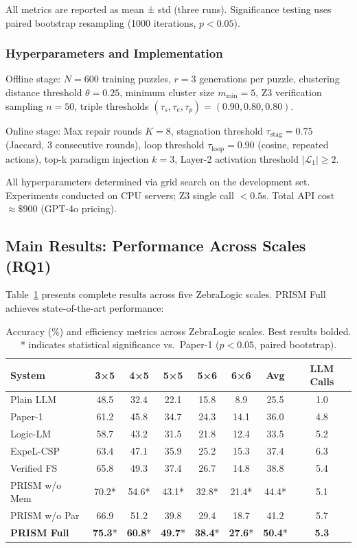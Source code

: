All metrics are reported as mean ± std (three runs). Significance testing uses paired bootstrap resampling (1000 iterations, $p < 0.05$).

\subsubsection{Hyperparameters and Implementation}

Offline stage: $N = 600$ training puzzles, $r = 3$ generations per puzzle, clustering distance threshold $\theta = 0.25$, minimum cluster size $m_{\min} = 5$, Z3 verification sampling $n = 50$, triple thresholds $(\tau_s, \tau_e, \tau_p) = (0.90, 0.80, 0.80)$.

Online stage: Max repair rounds $K = 8$, stagnation threshold $\tau_{\text{stag}} = 0.75$ (Jaccard, 3 consecutive rounds), loop threshold $\tau_{\text{loop}} = 0.90$ (cosine, repeated actions), top-k paradigm injection $k = 3$, Layer-2 activation threshold $|\mathcal{L}_1| \geq 2$.

All hyperparameters determined via grid search on the development set. Experiments conducted on CPU servers; Z3 single call $< 0.5$s. Total API cost $\approx \$900$ (GPT-4o pricing).

\subsection{Main Results: Performance Across Scales (RQ1)}

Table~\ref{tab:main} presents complete results across five ZebraLogic scales. PRISM Full achieves state-of-the-art performance:

\begin{table}[tb]
\centering
\caption{\label{tab:main} Accuracy (\%) and efficiency metrics across ZebraLogic scales. Best results bolded. * indicates statistical significance vs.\ Paper-1 ($p < 0.05$, paired bootstrap).}
\small
\begin{tabular}{l | ccccc | cc}
\hline
\textbf{System} & \textbf{3×5} & \textbf{4×5} & \textbf{5×5} & \textbf{5×6} & \textbf{6×6} & \textbf{Avg} & \textbf{LLM Calls} \\
\hline
Plain LLM & 48.5 & 32.4 & 22.1 & 15.8 & 8.9 & 25.5 & 1.0 \\
Paper-1 & 61.2 & 45.8 & 34.7 & 24.3 & 14.1 & 36.0 & 4.8 \\
Logic-LM & 58.7 & 43.2 & 31.5 & 21.8 & 12.4 & 33.5 & 5.2 \\
ExpeL-CSP & 63.4 & 47.1 & 35.9 & 25.2 & 15.3 & 37.4 & 6.3 \\
Verified FS & 65.8 & 49.3 & 37.4 & 26.7 & 14.8 & 38.8 & 5.4 \\
PRISM w/o Mem & 70.2* & 54.6* & 43.1* & 32.8* & 21.4* & 44.4* & 5.1 \\
PRISM w/o Par & 66.9 & 51.2 & 39.8 & 29.4 & 18.7 & 41.2 & 5.7 \\
\textbf{PRISM Full} & \textbf{75.3}* & \textbf{60.8}* & \textbf{49.7}* & \textbf{38.4}* & \textbf{27.6}* & \textbf{50.4}* & \textbf{5.3} \\
\hline
\end{tabular}
\end{table}

